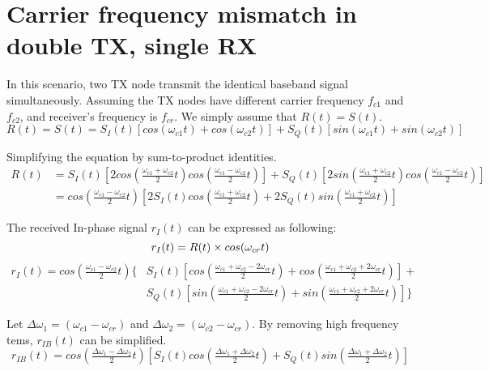 \clearpage
\section{Carrier frequency mismatch in double TX, single RX}
\label{sec:2tx1rx}
In this scenario, two TX node transmit the identical baseband signal simultaneously. Assuming the TX nodes have different
carrier frequency $f_{c1}$ and $f_{c2}$, and receiver's frequency is $f_{cr}$. We simply assume that $R(t) = S(t)$.
\begin{equation}
R(t) = S(t) = S_I(t)\left[cos(\omega_{c1}t) + cos(\omega_{c2}t)\right] + S_Q(t)\left[sin(\omega_{c1}t) + sin(\omega_{c2}t)\right]
\end{equation}

Simplifying the equation by sum-to-product identities.
\begin{align}
R(t)& = S_I(t)\left[2cos(\tfrac{\omega_{c1}+\omega_{c2}}{2}t)cos(\tfrac{\omega_{c1}-\omega_{c2}}{2}t)\right] +
S_Q(t)\left[2sin(\tfrac{\omega_{c1}+\omega_{c2}}{2}t)cos(\tfrac{\omega_{c1}-\omega_{c2}}{2}t)\right] \\
& = cos(\tfrac{\omega_{c1}-\omega_{c2}}{2}t)\left[
2S_I(t)cos(\tfrac{\omega_{c1}+\omega_{c2}}{2}t) + 2S_Q(t)sin(\tfrac{\omega_{c1}+\omega_{c2}}{2}t) \right]
\end{align}

The received In-phase signal $r_I(t)$ can be expressed as following:
\begin{equation}
r_I(t) = R(t) \times cos(\omega_{cr}t) \\
\end{equation}
\begin{align}
r_I(t) =  cos(\tfrac{\omega_{c1}-\omega_{c2}}{2}t)\{
&S_I(t)\left[cos(\tfrac{\omega_{c1}+\omega_{c2}-2\omega_{cr}}{2}t) + cos(\tfrac{\omega_{c1}+\omega_{c2}+2\omega_{cr}}{2}t)\right] + \nonumber \\
&S_Q(t)\left[sin(\tfrac{\omega_{c1}+\omega_{c2}-2\omega_{cr}}{2}t) + sin(\tfrac{\omega_{c1}+\omega_{c2}+2\omega_{cr}}{2}t)\right] 
\}
\end{align}

Let $\Delta\omega_1 = (\omega_{c1} - \omega_{cr})$ and $\Delta\omega_2 = (\omega_{c2} - \omega_{cr})$. By removing 
high frequency tems, $r_{IB}(t)$ can be simplified.
\begin{equation}
r_{IB}(t) = cos(\tfrac{\Delta\omega_1-\Delta\omega_2}{2}t)\left[
S_I(t)cos(\tfrac{\Delta\omega_1+\Delta\omega_2}{2}t) + S_Q(t)sin(\tfrac{\Delta\omega_1+\Delta\omega_2}{2}t)\right]
\end{equation}

